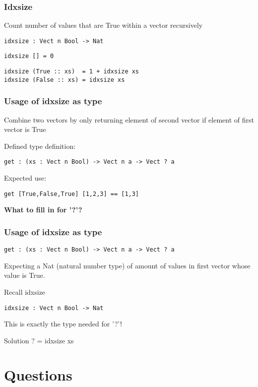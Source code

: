 \documentclass{beamer}
\begin{document}
\begin{frame}[fragile]
\frametitle{Idxsize}
\begin{example}
Count number of values that are True within a vector recursively 
\end{example}

\pause
\begin{lstlisting}
idxsize : Vect n Bool -> Nat
\end{lstlisting} \pause
\begin{lstlisting}
idxsize [] = 0
\end{lstlisting} \pause
\begin{lstlisting}
idxsize (True :: xs)  = 1 + idxsize xs
idxsize (False :: xs) = idxsize xs
\end{lstlisting}

\end{frame}

\begin{frame}[fragile]
\frametitle{Usage of idxsize as type}

\begin{example}
Combine two vectors by only returning element of second vector if element of first vector is True
\end{example}
Defined type definition:
\begin{lstlisting}
get : (xs : Vect n Bool) -> Vect n a -> Vect ? a
\end{lstlisting}

Expected use:
\begin{lstlisting}
get [True,False,True] [1,2,3] == [1,3]
\end{lstlisting}

\textbf{What to fill in for '?'? }


\end{frame}

\begin{frame}[fragile]
\frametitle{Usage of idxsize as type}
\begin{example}
\end{example}
\begin{lstlisting}
get : (xs : Vect n Bool) -> Vect n a -> Vect ? a
\end{lstlisting}

Expecting a Nat (natural number type) of amount of values in first vector whose value is True.
\pause
\begin{block}{Recall idxsize}
\end{block}
\begin{lstlisting}
idxsize : Vect n Bool -> Nat
\end{lstlisting}

This is exactly the type needed for '?'! 
\pause
\begin{alertblock}{Solution}
	? = idxsize xs
\end{alertblock}
\end{frame}

\section{Questions}
\end{document}

